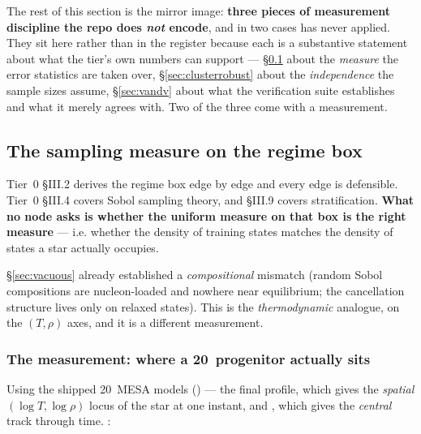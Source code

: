 The rest of this section is the mirror image: \textbf{three pieces of
measurement discipline the repo does \emph{not} encode}, and in two cases has
never applied. They sit here rather than in the register because each is a
substantive statement about what the tier's own numbers can support ---
\S\ref{sec:samplingmeasure} about the \emph{measure} the error statistics are
taken over, \S\ref{sec:clusterrobust} about the \emph{independence} the sample
sizes assume, \S\ref{sec:vandv} about what the verification suite establishes
and what it merely agrees with. Two of the three come with a measurement.

\subsection{The sampling measure on the regime box}
\label{sec:samplingmeasure}

Tier~0 \S III.2 derives the regime box edge by edge and every edge is
defensible. Tier~0 \S III.4 covers Sobol sampling theory, and \S III.9 covers
stratification. \textbf{What no node asks is whether the uniform measure on that
box is the right measure} --- i.e. whether the density of training states
matches the density of states a star actually occupies.

\S\ref{sec:vacuous} already established a \emph{compositional} mismatch (random
Sobol compositions are nucleon-loaded and nowhere near equilibrium; the
cancellation structure lives only on relaxed states). This is the
\emph{thermodynamic} analogue, on the $(T, \rho)$ axes, and it is a different
measurement.

\subsubsection{The measurement: where a 20\,\texorpdfstring{\Msun}{Msun}
               progenitor actually sits}
\label{sec:samplingmeasure-measurement}

Using the shipped 20\,\Msun{} MESA models
() --- the final
profile, which gives the \emph{spatial} $(\log T, \log\rho)$ locus of the star
at one instant, and , which gives the \emph{central}
track through time. \derivedhere:

